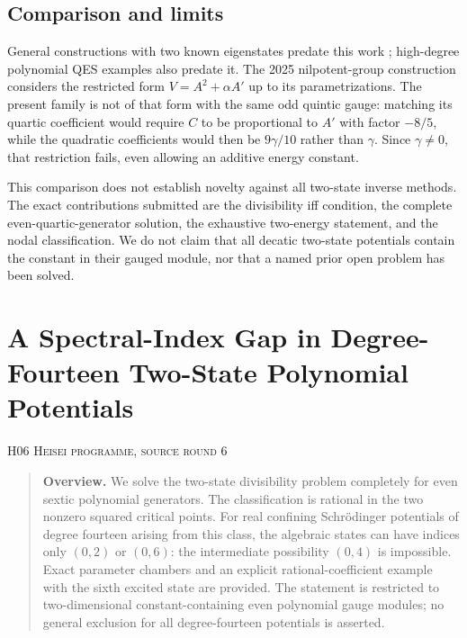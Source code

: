 \documentclass[11pt,a4paper]{article}
\theoremstyle{definition}\newtheorem{definition}[theorem]{Definition}
\theoremstyle{remark}\newtheorem{remark}[theorem]{Remark}
\numberwithin{equation}{section}
\begin{document}
\subsection{Comparison and limits}\label{H05-sec-5}
General constructions with two known eigenstates predate this work \cite{ref085}; high-degree polynomial QES examples also predate it. The 2025 nilpotent-group construction \cite{ref086} considers the restricted form $V=A^2+\alpha A'$ up to its parametrizations. The present family is not of that form with the same odd quintic gauge: matching its quartic coefficient would require $C$ to be proportional to $A'$ with factor $-8/5$, while the quadratic coefficients would then be $9\gamma/10$ rather than $\gamma$. Since $\gamma\ne0$, that restriction fails, even allowing an additive energy constant.

This comparison does not establish novelty against all two-state inverse methods. The exact contributions submitted are the divisibility iff condition, the complete even-quartic-generator solution, the exhaustive two-energy statement, and the nodal classification. We do not claim that all decatic two-state potentials contain the constant in their gauged module, nor that a named prior open problem has been solved.




\clearpage
\section[H06 --- A Spectral-Index Gap in Degree-Fourteen Two-State Polynomial Potentials]{A Spectral-Index Gap in Degree-Fourteen Two-State Polynomial Potentials}\label{contrib-H06}
\noindent\textsc{H06 \quad Heisei programme, source round 6}\par\medskip






\begin{quote}\small\textbf{Overview.} We solve the two-state divisibility problem completely for even sextic polynomial generators. The classification is rational in the two nonzero squared critical points. For real confining Schr\"odinger potentials of degree fourteen arising from this class, the algebraic states can have indices only $(0,2)$ or $(0,6)$: the intermediate possibility $(0,4)$ is impossible. Exact parameter chambers and an explicit rational-coefficient example with the sixth excited state are provided. The statement is restricted to two-dimensional constant-containing even polynomial gauge modules; no general exclusion for all degree-fourteen potentials is asserted.\end{quote}
\end{document}
